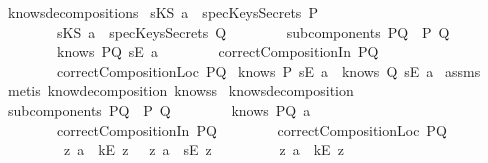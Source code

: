 \begin{isabellebody}
\isamarkupfalse%
\ knows{\isacharunderscore}decomposition{\isacharunderscore}{}{\isacharunderscore}s{\isacharcolon}\isanewline
{}\ {\isachardoublequoteopen}sKS\ a\ {\isasymnotin}\ specKeysSecrets\ P{\isachardoublequoteclose}\isanewline
\ \ \ \ \ \ \ \ {\isachardoublequoteopen}sKS\ a\ {\isasymnotin}\ specKeysSecrets\ Q{\isachardoublequoteclose}\isanewline
\ \ \ \ \ \ \ \ {\isachardoublequoteopen}subcomponents\ PQ\ {\isacharequal}\ {\isacharbraceleft}P{\isacharcomma}\ Q{\isacharbraceright}{\isachardoublequoteclose}\isanewline
\ \ \ \ \ \ \ \ {\isachardoublequoteopen}knows\ PQ\ {\isacharbrackleft}sE\ a{\isacharbrackright}{\isachardoublequoteclose}\isanewline
\ \ \ \ \ \ \ \ {\isachardoublequoteopen}correctCompositionIn\ PQ{\isachardoublequoteclose}\isanewline
\ \ \ \ \ \ \ \ {\isachardoublequoteopen}correctCompositionLoc\ PQ{\isachardoublequoteclose}\isanewline
{}\ {\isachardoublequoteopen}knows\ P\ {\isacharbrackleft}sE\ a{\isacharbrackright}\ {\isasymor}\ knows\ Q\ {\isacharbrackleft}sE\ a{\isacharbrackright}{\isachardoublequoteclose}\isanewline
%
\isadelimproof
%
\endisadelimproof
%
\isatagproof
{}\isamarkupfalse%
\ assms\ \isamarkupfalse%
\ {\isacharparenleft}metis\ know{\isacharunderscore}decomposition\ knows{}s{\isacharparenright}%
\endisatagproof
{\isafoldproof}%
%
\isadelimproof
\isanewline
%
\endisadelimproof
\isanewline
{}\isamarkupfalse%
\ knows{\isacharunderscore}decomposition{\isacharunderscore}{}{\isacharcolon}\isanewline
{}\ {\isachardoublequoteopen}subcomponents\ PQ\ {\isacharequal}\ {\isacharbraceleft}P{\isacharcomma}\ Q{\isacharbraceright}{\isachardoublequoteclose}\isanewline
\ \ \ \ \ \ \ \ {\isachardoublequoteopen}knows\ PQ\ {\isacharbrackleft}a{\isacharbrackright}{\isachardoublequoteclose}\isanewline
\ \ \ \ \ \ \ \ {\isachardoublequoteopen}correctCompositionIn\ PQ{\isachardoublequoteclose}\isanewline
\ \ \ \ \ \ \ \ {\isachardoublequoteopen}correctCompositionLoc\ PQ{\isachardoublequoteclose}\isanewline
\ \ \ \ \ \ \ \ {\isachardoublequoteopen}{\isacharparenleft}{\isasymexists}\ z{\isachardot}\ a\ {\isacharequal}\ kE\ z{\isacharparenright}\ {\isasymor}\ {\isacharparenleft}{\isasymexists}\ z{\isachardot}\ a\ {\isacharequal}\ sE\ z{\isacharparenright}{\isachardoublequoteclose}\isanewline
\ \ \ \ \ \ \ \ {\isachardoublequoteopen}{\isasymforall}\ z{\isachardot}\ a\ {\isacharequal}\ kE\ z\ {\isasymlongrightarrow}\ \isanewline

\end{isabellebody}

